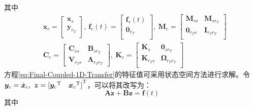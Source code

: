 其中
\begin{displaymath}
  \begin{aligned}
     & \boldsymbol{x}_{c}=\left[ \begin{matrix}
        \boldsymbol{x}_{s}   \\
        \boldsymbol{y}_{r_T} \\
      \end{matrix} \right],\
    \boldsymbol{f}_c(t)=\left[ \begin{matrix}
        \boldsymbol{f}_{s}(t) \\
        \boldsymbol{0}_{r_T}  \\
      \end{matrix} \right],\
    \boldsymbol{M}_{c}=\left[ \begin{matrix}
        \boldsymbol{M}_{ss}   & \boldsymbol{M}_{sr_T}   \\
        \boldsymbol{0}_{r_Ts} & \boldsymbol{I}_{r_Tr_T} \\
      \end{matrix} \right]      \\
     & \boldsymbol{C}_{c}=\left[ \begin{matrix}
        \boldsymbol{C}_{ss}   & \boldsymbol{B}_{sr_T}         \\
        \boldsymbol{V}_{r_Ts} & \boldsymbol{\Lambda}_{r_Tr_T}
      \end{matrix} \right],\
    \boldsymbol{K}_{c}=\left[ \begin{matrix}
        \boldsymbol{K}_{s}    & \boldsymbol{0}_{sr_T}        \\
        \boldsymbol{K}_{r_Ts} & \boldsymbol{\Omega}_{r_Tr_T} \\
      \end{matrix} \right]
  \end{aligned}
\end{displaymath}
方程\eqref{eq:Final-Coupled-1D-Transfer}的特征值可采用状态空间方法进行求解。令$\boldsymbol{y}_c=\dot{\boldsymbol{x}}_c,\ \boldsymbol{z}={[ {\boldsymbol{y}_c}^{\ut}\quad {\boldsymbol{x}_c}^{\ut} ]}^{\ut}$，可以将其改写为：
\begin{equation}
  \boldsymbol{A}\dot{\boldsymbol{z}}+ \boldsymbol{B}\boldsymbol{z}=\boldsymbol{f}(t)
\end{equation}
其中

